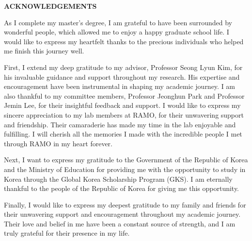 \clearpage
{}
\begin{centering}
\textbf{ACKNOWLEDGEMENTS}\\
\vspace{\baselineskip}
\end{centering}

As I complete my master’s degree, I am grateful to have been surrounded by wonderful people, which allowed me to enjoy a happy graduate school life. I would like to express my heartfelt thanks to the precious individuals who helped me finish this journey well.

First, I extend my deep gratitude to my advisor, Professor Seong Lyun Kim, for his invaluable guidance and support throughout my research. His expertise and encouragement have been instrumental in shaping my academic journey. I am also thankful to my committee members, Professor Jeonghun Park and Professor Jemin Lee, for their insightful feedback and support.
I would like to express my sincere appreciation to my lab members at RAMO, for their unwavering support and friendship. Their camaraderie has made my time in the lab enjoyable and fulfilling. I will cherish all the memories I made with the incredible people I met through RAMO in my heart forever.

Next, I want to express my gratitude to the Government of the Republic of Korea and the Ministry of Education for providing me with the opportunity to study in Korea through the Global Korea Scholarship Program (GKS). I am eternally thankful to the people of the Republic of Korea for giving me this opportunity. 

Finally, I would like to express my deepest gratitude to my family and friends for their unwavering support and encouragement throughout my academic journey. Their love and belief in me have been a constant source of strength, and I am truly grateful for their presence in my life.

\thispagestyle{empty}
\clearpage
